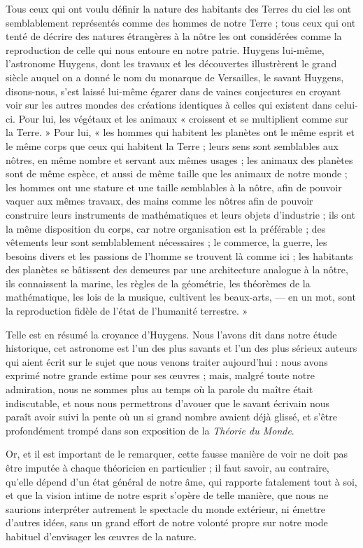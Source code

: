 \documentclass[a4paper, 11pt, oneside]{article}
\begin{document}
Tous ceux qui ont voulu définir la nature des habitants des Terres du ciel les ont semblablement représentés comme des hommes de notre Terre ; tous ceux qui ont tenté de décrire des natures étrangères à la nôtre les ont considérées comme la reproduction de celle qui nous entoure en notre patrie. Huygens lui-même, l'astronome Huygens, dont les travaux et les découvertes illustrèrent le grand siècle auquel on a donné le nom du monarque de Versailles, le savant Huygens, disons-nous, s'est laissé lui-même égarer dans de vaines conjectures en croyant voir sur les autres mondes des créations identiques à celles qui existent dans celui-ci. Pour lui, les végétaux et les animaux « croissent et se multiplient comme sur la Terre. » Pour lui, « les hommes qui habitent les planètes ont le même esprit et le même corps que ceux qui habitent la Terre ; leurs sens sont semblables aux nôtres, en même nombre et servant aux mêmes usages ; les animaux des planètes sont de même espèce, et aussi de même taille que les animaux de notre monde ; les hommes ont une stature et une taille semblables à la nôtre, afin de pouvoir vaquer aux mêmes travaux, des mains comme les nôtres afin de pouvoir construire leurs instruments de mathématiques et leurs objets d'industrie ; ils ont la même disposition du corps, car notre organisation est la préférable ; des vêtements leur sont semblablement nécessaires ; le commerce, la guerre, les besoins divers et les passions de l'homme se trouvent là comme ici ; les habitants des planètes se bâtissent des demeures par une architecture analogue à la nôtre, ils connaissent la marine, les règles de la géométrie, les théorèmes de la mathématique, les lois de la musique, cultivent les beaux-arts, --- en un mot, sont la reproduction fidèle de l'état de l'humanité terrestre. »

Telle est en résumé la croyance d'Huygens. Nous l'avons dit dans notre étude historique, cet astronome est l'un des plus savants et l'un des plus sérieux auteurs qui aient écrit sur le sujet que nous venons traiter aujourd'hui : nous avons exprimé notre grande estime pour ses œuvres ; mais, malgré toute notre admiration, nous ne sommes plus au temps où la parole du maître était indiscutable, et nous nous permettrons d'avouer que le savant écrivain nous paraît avoir suivi la pente où un si grand nombre avaient déjà glissé, et s'être profondément trompé dans son exposition de la \emph{Théorie du Monde}.

Or, et il est important de le remarquer, cette fausse manière de voir ne doit pas être imputée à chaque théoricien en particulier ; il faut savoir, au contraire, qu'elle dépend d'un état général de notre âme, qui rapporte fatalement tout à soi, et que la vision intime de notre esprit s'opère de telle manière, que nous ne saurions interpréter autrement le spectacle du monde extérieur, ni émettre d'autres idées, sans un grand effort de notre volonté propre sur notre mode habituel d'envisager les œuvres de la nature.
\end{document}
